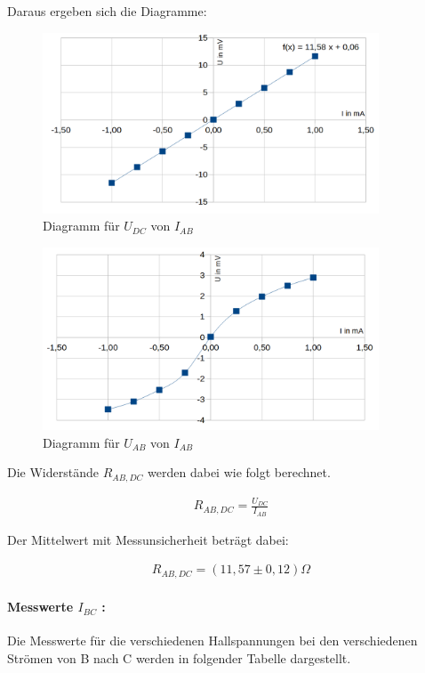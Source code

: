 \documentclass[a4paper]{scrartcl}
\numberwithin{equation}{subsection}
\begin{document}
Daraus ergeben sich die Diagramme:

\begin{figure}[H]
\includegraphics[width=10cm]{diagramm_messwerte_Iab-Udc}
\centering
\caption{Diagramm für $U_{DC}$ von $I_{AB}$}
\centering
\label{fig:diagramm_messwerte_Iab-Udc}
\end{figure}

\begin{figure}[H]
\includegraphics[width=10cm]{diagramm_messwerte_Iab-Uab}
\centering
\caption{Diagramm für $U_{AB}$ von $I_{AB}$}
\centering
\label{fig:diagramm_messwerte_Iab-Udc}
\end{figure}

Die Widerstände $R_{AB,DC}$ werden dabei wie folgt berechnet.

\begin{align}
R_{AB,DC} = \frac{U_{DC}}{I_{AB}}
\end{align}

Der Mittelwert mit Messunsicherheit beträgt dabei:

\begin{align*}
R_{AB,DC} = (11,57 \pm 0,12)\Omega
\end{align*}

\paragraph{Messwerte $I_{BC}$ :\\}
Die Messwerte für die verschiedenen Hallspannungen bei den verschiedenen Strömen von B nach C werden in folgender Tabelle dargestellt.
\end{document}
